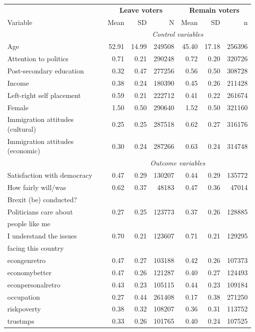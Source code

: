 \documentclass[12pt, letter]{article}
\begin{document}
 \begin{table}[ht]
\centering
\begin{tabular}{lrrrrrr}
& \multicolumn{3}{c}{\textbf{Leave voters}} & \multicolumn{3}{c}{\textbf{Remain voters}} \\
 \cmidrule[1pt](lr){2-4} \cmidrule[1pt](lr){5-7}
Variable & Mean & SD & N & Mean & SD & n  \\ 

\toprule[1.5pt]
& \multicolumn{6}{c}{\textit{Control variables}} \\
  Age & 52.91 & 14.99 & 249508 & 45.40 & 17.18 & 256396 \\ 
  Attention to politics & 0.71 & 0.21 & 290248 & 0.72 & 0.20 & 320726 \\ 
  Post-secondary education & 0.32 & 0.47 & 277256 & 0.56 & 0.50 & 308728 \\ 
  Income & 0.38 & 0.24 & 180390 & 0.45 & 0.26 & 211428 \\ 
  Left-right self placement & 0.59 & 0.21 & 222712 & 0.41 & 0.22 & 261674 \\ 
  Female & 1.50 & 0.50 & 290640 & 1.52 & 0.50 & 321160 \\ 
  Immigration attitudes (cultural) & 0.25 & 0.25 & 287518 & 0.62 & 0.27 & 316176 \\ 
  Immigration attitudes (economic) & 0.30 & 0.24 & 287266 & 0.63 & 0.24 & 314748 \\
  
& \multicolumn{6}{c}{\textit{Outcome variables}} \\
  Satisfaction with democracy & 0.47 & 0.29 & 130207 & 0.44 & 0.29 & 135772 \\   
  How fairly will/was  & 0.62 & 0.37 & 48183 & 0.47 & 0.36 & 47014 \\ 
  Brexit (be) conducted? & & & & & & \\
 
  Politicians care about & 0.27 & 0.25 & 123773 & 0.37 & 0.26 & 128885 \\ 
  people like me & & & & & & \\
  I understand the issues & 0.70 & 0.21 & 123607 & 0.71 & 0.21 & 129295 \\
  facing this country & & & & & & \\ 
  econgenretro & 0.47 & 0.27 & 103188 & 0.42 & 0.26 & 107373 \\ 
  economybetter & 0.47 & 0.26 & 121287 & 0.40 & 0.27 & 124493 \\ 
  econpersonalretro & 0.43 & 0.23 & 105115 & 0.44 & 0.23 & 109184 \\
  occupation & 0.27 & 0.44 & 261408 & 0.17 & 0.38 & 271250 \\ 
  riskpoverty & 0.38 & 0.32 & 108207 & 0.36 & 0.31 & 113752 \\ 

  trustmps & 0.33 & 0.26 & 101765 & 0.40 & 0.24 & 107525 \\ 
   \hline
\end{tabular}
\end{table}
\end{document}
